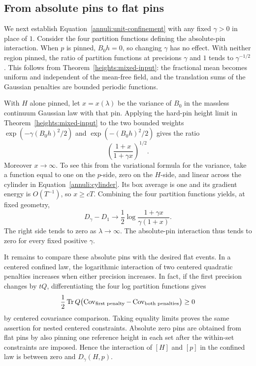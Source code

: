 \subsection{From absolute pins to flat pins}

We next establish Equation~\eqref{annuli:unit-confinement} with any
fixed \(\gamma>0\) in place of \(1\). Consider the four partition
functions defining the absolute-pin interaction. When \(p\) is
pinned, \(B_0h=0\), so changing \(\gamma\) has no effect. With neither
region pinned, the ratio of partition functions at precisions
\(\gamma\) and \(1\) tends to \(\gamma^{-1/2}\). This follows from
Theorem~\ref{heights:mixed-input}: the fractional mean becomes uniform and
independent of the mean-free field, and the translation sums of the
Gaussian penalties are bounded periodic functions.

With \(H\) alone pinned, let \(x=x(\lambda)\) be the variance of \(B_0\)
in the massless continuum Gaussian law with that pin. Applying the
hard-pin height limit in Theorem~\ref{heights:mixed-input} to the two bounded weights
\(\exp(-\gamma(B_0h)^2/2)\) and \(\exp(-(B_0h)^2/2)\) gives the ratio
\[
 \left(\frac{1+x}{1+\gamma x}\right)^{1/2}.
\]
Moreover \(x\to\infty\). To see this from the variational formula for
the variance, take a function equal to one on the \(p\)-side, zero
on the \(H\)-side, and linear across the cylinder
in Equation~\eqref{annuli:cylinder}. Its box average is one and
its gradient energy is \(O(T^{-1})\), so \(x\ge cT\).
Combining the four partition functions yields, at fixed geometry,
\begin{equation}\label{annuli:change-confinement}
 D_\gamma-D_1\longrightarrow
       \frac12\log\frac{1+\gamma x}{\gamma(1+x)}.
\end{equation}
The right side tends to zero as \(\lambda\to\infty\). The absolute-pin
interaction thus tends to zero for every fixed positive \(\gamma\).

It remains to compare these absolute pins with the desired flat
events. In a centered confined law, the logarithmic interaction of
two centered quadratic penalties increases when either precision
increases. In fact, if the first precision changes by \(tQ\),
differentiating the four log partition functions gives
\[
 \frac12\operatorname{Tr} Q\bigl(\operatorname{Cov}_{\text{first penalty}}
                    -\operatorname{Cov}_{\text{both penalties}}\bigr)\ge0
\]
by centered covariance comparison. Taking equality limits proves
the same assertion for nested centered constraints. Absolute zero
pins are obtained from flat pins by also pinning one reference
height in each set after the within-set constraints are imposed.
Hence the interaction of \([H]\) and \([p]\)
in the confined law is between zero and \(D_\gamma(H,p)\).

